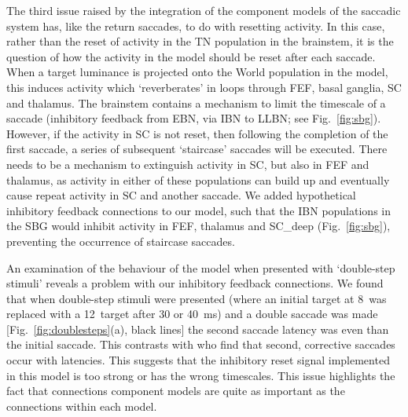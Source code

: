 \documentclass{frontiersSCNS}
\begin{document}
The third issue raised by the integration of the component models of
the saccadic system has, like the return saccades, to do with
resetting activity. In this case, rather than the reset of activity in
the TN population in the brainstem, it is the question of how the
activity in the  model should be reset after each
saccade. When a target luminance is projected onto the World
population in the model, this induces activity which `reverberates' in
loops through FEF, basal ganglia, SC and thalamus. The brainstem
contains a mechanism to limit the timescale of a saccade (inhibitory
feedback from EBN, via IBN to LLBN; see Fig.~\ref{fig:sbg}). However, if
the activity in SC is not reset, then following the completion of the
first saccade, a series of subsequent `staircase' saccades will be
executed. There needs to be a mechanism to extinguish activity in SC,
but also in FEF and thalamus, as activity in either of these
populations can build up and eventually cause repeat activity in SC
and another saccade. We added hypothetical inhibitory feedback
connections to our model, such that the IBN populations in the SBG
would inhibit activity in FEF, thalamus and SC\_deep (Fig.~\ref{fig:sbg}),
preventing the occurrence of staircase saccades.

An examination of the behaviour of the model when presented with
`double-step stimuli' reveals a problem with our inhibitory feedback
connections. We found that when double-step stimuli were presented (where
an initial target at 8\dg~was replaced with a 12\dg~target after 30 or
40~ms) and a double saccade was made [Fig.~\ref{fig:doublesteps}(a), black
lines] the second saccade latency was  even than the initial
saccade. This contrasts with \cite{becker_analysis_1979} who find that
second, corrective saccades occur with  latencies.  This
suggests that the inhibitory reset signal implemented in this model is
too strong or has the wrong timescales. This issue highlights the fact
that connections  component models are quite as important
as the connections within each model.
\end{document}
